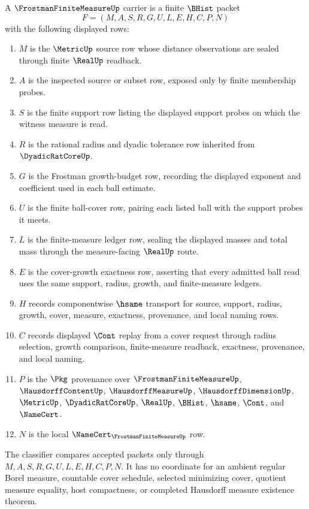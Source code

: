 \begin{definition}
\label{def:frostman-finite-measure-carrier}
A $\FrostmanFiniteMeasureUp$ carrier is a finite $\BHist$ packet
$$
F=(M,A,S,R,G,U,L,E,H,C,P,N)
$$
with the following displayed rows:
\begin{enumerate}
\item $M$ is the $\MetricUp$ source row whose distance observations are sealed through finite $\RealUp$ readback.
\item $A$ is the inspected source or subset row, exposed only by finite membership probes.
\item $S$ is the finite support row listing the displayed support probes on which the witness measure is read.
\item $R$ is the rational radius and dyadic tolerance row inherited from $\DyadicRatCoreUp$.
\item $G$ is the Frostman growth-budget row, recording the displayed exponent and coefficient used in each ball estimate.
\item $U$ is the finite ball-cover row, pairing each listed ball with the support probes it meets.
\item $L$ is the finite-measure ledger row, sealing the displayed masses and total mass through the measure-facing $\RealUp$ route.
\item $E$ is the cover-growth exactness row, asserting that every admitted ball read uses the same support, radius, growth, and finite-measure ledgers.
\item $H$ records componentwise $\hsame$ transport for source, support, radius, growth, cover, measure, exactness, provenance, and local naming rows.
\item $C$ records displayed $\Cont$ replay from a cover request through radius selection, growth comparison, finite-measure readback, exactness, provenance, and local naming.
\item $P$ is the $\Pkg$ provenance over $\FrostmanFiniteMeasureUp$, $\HausdorffContentUp$, $\HausdorffMeasureUp$, $\HausdorffDimensionUp$, $\MetricUp$, $\DyadicRatCoreUp$, $\RealUp$, $\BHist$, $\hsame$, $\Cont$, and $\NameCert$.
\item $N$ is the local $\NameCert_{\FrostmanFiniteMeasureUp}$ row.
\end{enumerate}
The classifier compares accepted packets only through $M,A,S,R,G,U,L,E,H,C,P,N$. It has no coordinate for an ambient regular Borel measure, countable cover schedule, selected minimizing cover, quotient measure equality, host compactness, or completed Hausdorff measure existence theorem.
\end{definition}

